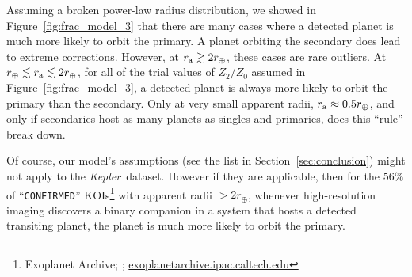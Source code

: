 \documentclass[12pt,modern]{aastex61}
\renewcommand{\a}{_{\rm a}}
\begin{document}

Assuming a broken power-law radius distribution, we showed in 
Figure~\ref{fig:frac_model_3} that there are many cases where a detected 
planet 
is much more likely to orbit the primary.
A planet orbiting the secondary does lead to extreme corrections.
However, at $r\a \gtrsim 2r_\oplus$, these cases are rare outliers.
At $r_\oplus \lesssim r\a \lesssim 2r_\oplus$, for all of the trial values of 
$Z_2/Z_0$ assumed in Figure~\ref{fig:frac_model_3}, a detected planet is 
always 
more likely to orbit the primary than the secondary.
Only at very small apparent radii, $r\a \approx 0.5r_\oplus$, and only if 
secondaries host as many planets as singles and primaries, does this ``rule'' 
break down.

Of course, our model's assumptions (see the list in Section~\ref{sec:conclusion}) 
might not apply to the {\it Kepler}\ dataset.
However if they are applicable, then for the $56\%$ of ``\texttt{CONFIRMED}'' 
KOIs\footnote{Exoplanet Archive; \cite{akeson_nasa_2013}; 
    \url{exoplanetarchive.ipac.caltech.edu}} with 
apparent radii $>2r_\oplus$, 
whenever high-resolution imaging 
discovers a binary companion in 
a system that hosts a detected transiting planet, the planet is much
more likely to orbit the primary.
\end{document}

